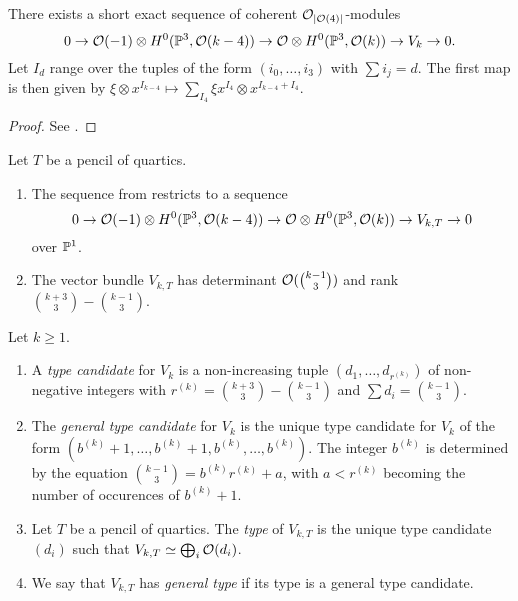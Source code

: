 \begin{proposition} \label{verlinde-exact-sequence}
	There exists a short exact sequence of coherent
	$\mathcal{O}_{\lvert\mathcal{O}(4)\rvert}$-modules 
	\[
	0 \to \mathcal{O}(-1) \otimes H^0(\mathbb{P}^3, \mathcal{O}(k-4)) \to \mathcal{O} \otimes H^0(\mathbb{P}^3, \mathcal{O}(k)) \to V_k \to 0.
	\]
	Let $I_d$ range over the tuples of the form
	$(i_0,\dotsc,i_3)$
	with
	$\sum i_j = d$.
	The first map is then given by 
	$\xi \otimes x^{I_{k-4}}
	\mapsto
	\sum_{I_4} \xi x^{I_4} \otimes x^{I_{k-4}+I_4}$.   
	\end{proposition}

\begin{proof}
	See \cite[Proposition 4.2]{hemminghaus-verlinde-bundles}.
\end{proof}

\begin{remark}
	Let $T$ be a pencil of quartics.

	\begin{enumerate}
	\item The sequence from  restricts to a sequence
	\[
	0 \to \mathcal{O}(-1) \otimes H^0(\mathbb{P}^3, \mathcal{O}(k-4)) \to \mathcal{O} \otimes H^0(\mathbb{P}^3, \mathcal{O}(k)) \to V_{k,T} \to 0
	\]
	over $\mathbb{P}^1$.

	\item The vector bundle $V_{k,T}$ has determinant $\mathcal{O}(\binom{k-1}{3})$ and rank $\binom{k+3}{3} - \binom{k-1}{3}$.
	\end{enumerate}
\end{remark}

\begin{definition}
Let $k\geq 1$.

\begin{enumerate}
\item A \emph{type candidate} for $V_k$ is a non-increasing tuple $(d_1,\dotsc,d_{r^{(k)}})$ of non-negative integers with
$r^{(k)}=\binom{k+3}{3}-\binom{k-1}{3}$ and $\sum d_i = \binom{k-1}{3}$.

\item The \emph{general type candidate} for $V_k$ is the unique type candidate for $V_k$ of the form
$(b^{(k)} + 1,\dotsc,b^{(k)} + 1,b^{(k)},\dotsc,b^{(k)})$. The integer $b^{(k)}$ is determined by the equation
$\binom{k-1}{3} = b^{(k)} r^{(k)} + a$, with $a < r^{(k)}$ becoming the number of occurences of $b^{(k)} +1$. 

\item Let $T$ be a pencil of quartics. The \emph{type} of $V_{k,T}$ is the unique type candidate $(d_i)$ such that
$V_{k,T} \simeq \bigoplus_i \mathcal{O}(d_i)$.

\item We say that $V_{k,T}$ has \emph{general type} if its type is a general type candidate.

\end{enumerate}
\end{definition}

